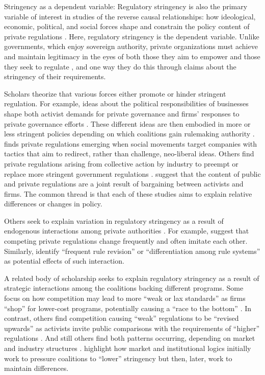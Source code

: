 \documentclass[
      12pt,
            Review ]{article}
\begin{document}
Stringency as a dependent variable: Regulatory stringency is also the
primary variable of interest in studies of the reverse causal
relationships: how ideological, economic, political, and social forces
shape and constrain the policy content of private regulations
\citep{Bartley2003, Cashore2004, Fischer2014}. Here, regulatory
stringency is the dependent variable. Unlike governments, which enjoy
sovereign authority, private organizations must achieve and maintain
legitimacy in the eyes of both those they aim to empower and those they
seek to regulate \citep{Bartley2007, Bodansky1999, Cashore2002}, and one
way they do this through claims about the stringency of their
requirements.

Scholars theorize that various forces either promote or hinder stringent
regulation. For example, ideas about the political responsibilities of
businesses shape both activist demands for private governance and firms'
responses to private governance efforts \citep{Bartley2003, Djelic2017}.
These different ideas are then embodied in more or less stringent
policies depending on which coalitions gain rulemaking authority
\citep{Botzem2012, Hsueh2012}. \citet{Bartley2003} finds private
regulations emerging when social movements target companies with tactics
that aim to redirect, rather than challenge, neo-liberal ideas. Others
find private regulations arising from collective action by industry to
preempt or replace more stringent government regulations
\citep{Bartley2007, Cashore2002, Grabosky2013, Green2013, Loconto2014, Lyon2008, Maxwell2000, Prakash2000}.
\citet{Abbott2009} suggest that the content of public and private
regulations are a joint result of bargaining between activists and
firms. The common thread is that each of these studies aims to explain
relative differences or changes in policy.

Others seek to explain variation in regulatory stringency as a result of
endogenous interactions among private authorities
\citep{DeLeon2009, Eberlein2014, Green2017, Gulbrandsen2014, Howard-Grenville2008, Li2015, Mills2016d}.
For example, \citet{Smith2010} suggest that competing private
regulations change frequently and often imitate each other. Similarly,
\citet{Eberlein2014} identify ``frequent rule revision'' or
``differentiation among rule systems'' as potential effects of such
interaction.

A related body of scholarship seeks to explain regulatory stringency as
a result of strategic interactions among the coalitions backing
different programs. Some focus on how competition may lead to more
``weak or lax standards'' as firms ``shop'' for lower-cost programs,
potentially causing a ``race to the bottom''
\citep{Abbott2010, Fransen2011, Gulbrandsen2004}. In contrast, others
find competition causing ``weak'' regulations to be ``revised upwards''
as activists invite public comparisons with the requirements of
``higher'' regulations \citep{Overdevest2005, Overdevest2010}. And still
others find both patterns occurring, depending on market and industry
structures \citep{Cashore2004, Hassel2008, VanderVen2015}.
\citet{Cashore2004} highlight how market and institutional logics
initially work to pressure coalitions to ``lower'' stringency but then,
later, work to maintain differences.
\end{document}
